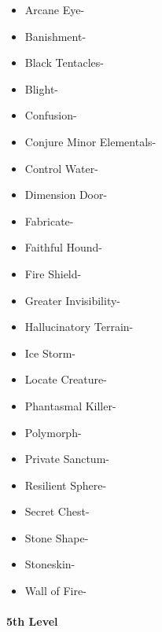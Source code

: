 \documentclass[
]{article}
\providecommand{\tightlist}{%
  \setlength{\itemsep}{0pt}\setlength{\parskip}{0pt}}
\begin{document}
\begin{itemize}
\tightlist
\item
  Arcane Eye-
\item
  Banishment-
\item
  Black Tentacles-
\item
  Blight-
\item
  Confusion-
\item
  Conjure Minor Elementals-
\item
  Control Water-
\item
  Dimension Door-
\item
  Fabricate-
\item
  Faithful Hound-
\item
  Fire Shield-
\item
  Greater Invisibility-
\item
  Hallucinatory Terrain-
\item
  Ice Storm-
\item
  Locate Creature-
\item
  Phantasmal Killer-
\item
  Polymorph-
\item
  Private Sanctum-
\item
  Resilient Sphere-
\item
  Secret Chest-
\item
  Stone Shape-
\item
  Stoneskin-
\item
  Wall of Fire-
\end{itemize}

\hypertarget{5th-level-7}{%
\paragraph{5th Level}\label{5th-level-7}}
\end{document}
